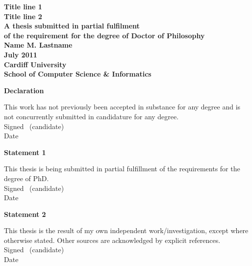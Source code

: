 \documentclass[a4paper,oneside,onecolumn,openright,12pt]{book}
\begin{document}
\frontmatter


\begin{titlepage}

\begin{center}
\vspace*{3ex}
\textbf{\Huge Title line 1}\\[2ex]
\textbf{\Huge Title line 2}\\[12ex]
\textbf{\large A thesis submitted in partial fulfilment}\\[1ex]
\textbf{\large of the requirement for the degree of Doctor of
  Philosophy}\\[16ex]
\textbf{\LARGE Name M. Lastname}\\
\vfill
\textbf{\LARGE July 2011}\\
\vfill
\textbf{\LARGE Cardiff University}\\[1ex]
\textbf{\LARGE School of Computer Science \& Informatics}\\[4ex]
\end{center}

\end{titlepage}
\newpage\thispagestyle{empty}\cleardoublepage


\thispagestyle{plain}

\vspace*{6ex}

\textbf{\large Declaration}

This work has not previously been accepted in substance for any degree and is not concurrently submitted in candidature for any degree.\\[2ex]
Signed \dotfill \ (candidate) \hspace*{10em}\\[1ex]
Date\ \ \ \ \ \dotfill \hspace*{18em}

\vfill

\textbf{\large Statement 1}

This thesis is being submitted in partial fulfillment of the requirements for the degree of PhD.\\[2ex]
Signed \dotfill \ (candidate) \hspace*{10em}\\[1ex]
Date\ \ \ \ \ \dotfill \hspace*{18em}

\textbf{\large Statement 2}

This thesis is the result of my own independent work/investigation,
except where otherwise stated. Other sources are acknowledged by
explicit references.\\[2ex]
Signed \dotfill \ (candidate) \hspace*{10em}\\[1ex]
Date\ \ \ \ \ \dotfill \hspace*{18em}
\end{document}

